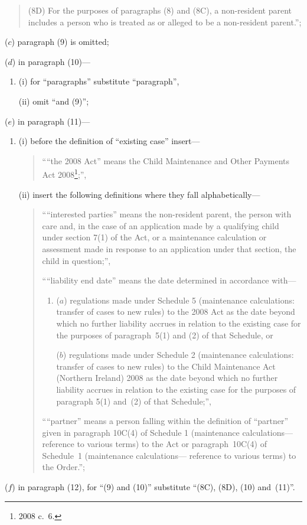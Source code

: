 \documentclass[12pt,a4paper]{article}
\begin{document}
\begin{enumerate}
\begin{quotation}
(8D) For the purposes of paragraphs (8) and (8C), a non-resident parent includes a 
person who is treated as or alleged to be a non-resident parent.'';
\end{quotation}

($c$) paragraph (9) is omitted;

($d$) in paragraph (10)---
\begin{enumerate}\item[]
(i) for ``paragraphs'' substitute ``paragraph'',

(ii) omit ``and (9)'';
\end{enumerate}

($e$) in paragraph (11)---
\begin{enumerate}\item[]
(i) before the definition of ``existing case'' insert---
\begin{quotation}
````the 2008 Act'' means the Child Maintenance and Other Payments Act 2008\footnote{2008 c.~6.};'',
\end{quotation}

(ii) insert the following definitions where they fall alphabetically---
\begin{quotation}
````interested parties'' means the non-resident parent, the person with care and, in
the case of an application made by a qualifying child under section 7(1) of the
Act, or a maintenance calculation or assessment made in response to an
application under that section, the child in question;'',

````liability end date'' means the date determined in accordance with---
\begin{enumerate}\item[]
($a$) regulations made under Schedule 5 (maintenance calculations: transfer
of cases to new rules) to the 2008 Act as the date beyond which no 
further liability accrues in relation to the existing case for the purposes
of paragraph~5(1) and (2) of that Schedule, or

($b$) regulations made under Schedule 2 (maintenance calculations: transfer
of cases to new rules) to the Child Maintenance Act (Northern Ireland)
2008 as the date beyond which no further liability accrues in relation to
the existing case for the purposes of paragraph 5(1) and~(2) of that
Schedule;'',
\end{enumerate}

````partner'' means a person falling within the definition of ``partner'' given in 
paragraph 10C(4) of Schedule 1 (maintenance calculations---reference to various
terms) to the Act or paragraph~10C(4) of Schedule~1 (maintenance calculations---%
reference to various terms) to the Order.'';
\end{quotation}
\end{enumerate}

($f$) in paragraph (12), for ``(9) and (10)'' substitute ``(8C), (8D), (10) and~(11)''.
\end{enumerate}
\end{document}
